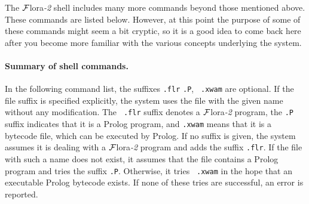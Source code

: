\documentclass[11pt]{article}
\newcommand{\FLORA}{{\mbox{\sc ${\cal F}${lora}\rm\emph{-2}}}\xspace}
\newcommand{\ofile}{xwam}
\begin{document}
The \FLORA shell includes many more commands beyond those mentioned above.
These commands are listed below. However, at this point the purpose of some
of these commands might seem a bit cryptic, so it is a good idea to come
back here after you become more familiar with the various concepts
underlying the system.

\paragraph{Summary of shell commands.}
In the following command list, the suffixes {\tt .flr} {\tt .P}, {\tt
  .\ofile} are optional. If the file suffix is specified explicitly, the
system uses the file with the given name without any modification. The {\tt
  .flr} suffix denotes a \FLORA program, the {\tt .P} suffix indicates that
it is a Prolog program, and {\tt .\ofile} means that it is a bytecode file,
which can be executed by Prolog.  If no suffix is given, the system assumes it
is dealing with a \FLORA program and adds the suffix {\tt .flr}. If the
file with such a name does not exist, it assumes that the file contains a
Prolog program and tries the suffix {\tt .P}. Otherwise, it tries {\tt
  .\ofile} in the hope that an executable Prolog bytecode exists. If none of
these tries are successful, an error is reported.
%
\end{document}
